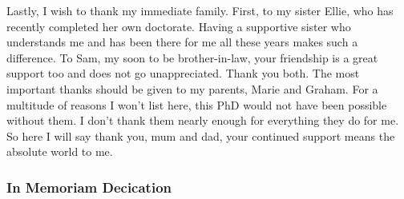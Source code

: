 \documentclass[a4paper,oneside,12pt]{book}
\numberwithin{equation}{chapter} %
\begin{document}


Lastly, I wish to thank my immediate family. First, to my sister Ellie, who has recently completed her own doctorate. Having a supportive sister who understands me and has been there for me all these years makes such a difference. To Sam, my soon to be brother-in-law, your friendship is a great support too and does not go unappreciated. Thank you both. The most important thanks should be given to my parents, Marie and Graham. For a multitude of reasons I won't list here, this PhD would not have been possible without them. I don't thank them nearly enough for everything they do for me. So here I will say thank you, mum and dad, your continued support means the absolute world to me.

\subsubsection{In Memoriam Decication}
\end{document}
